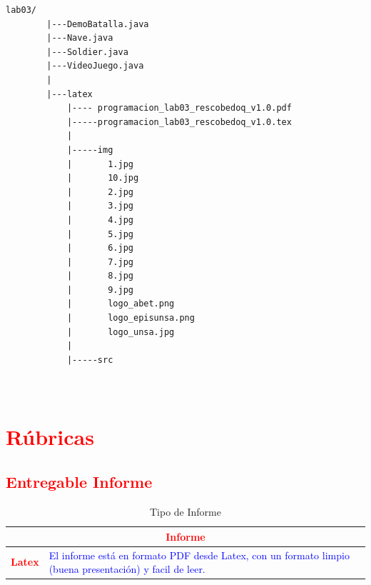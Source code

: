 \documentclass{article}
\begin{document}
	\begin{lstlisting}[style=ascii-tree]
		lab03/
		|---DemoBatalla.java
		|---Nave.java
		|---Soldier.java
		|---VideoJuego.java
		|
		|---latex
			|---- programacion_lab03_rescobedoq_v1.0.pdf
			|-----programacion_lab03_rescobedoq_v1.0.tex
			|
			|-----img
			|       1.jpg
			|       10.jpg
			|       2.jpg
			|       3.jpg
			|       4.jpg
			|       5.jpg
			|       6.jpg
			|       7.jpg
			|       8.jpg
			|       9.jpg
			|       logo_abet.png
			|       logo_episunsa.png
			|       logo_unsa.jpg
			|
			|-----src
			
		
	\end{lstlisting}    
	
	\section{\textcolor{red}{Rúbricas}}
	
	\subsection{\textcolor{red}{Entregable Informe}}
	\begin{table}[H]
		\caption{Tipo de Informe}
		\setlength{\tabcolsep}{0.5em} %
		{\renewcommand{\arraystretch}{1.5}%
			\begin{tabular}{|p{3cm}|p{12cm}|}
				\hline
				\multicolumn{2}{|c|}{\textbf{\textcolor{red}{Informe}}}  \\
				\hline 
				\textbf{\textcolor{red}{Latex}} & \textcolor{blue}{El informe está en formato PDF desde Latex,  con un formato limpio (buena presentación) y facil de leer.}   \\ 
				\hline 
				
				
			\end{tabular}
		}
	\end{table}
	
	\clearpage
	
\end{document}
